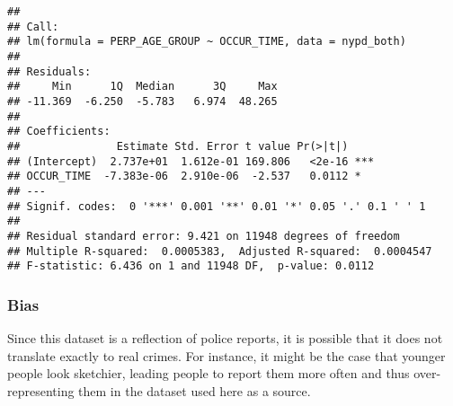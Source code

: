 \documentclass[
]{article}
\begin{document}
\begin{verbatim}
## 
## Call:
## lm(formula = PERP_AGE_GROUP ~ OCCUR_TIME, data = nypd_both)
## 
## Residuals:
##     Min      1Q  Median      3Q     Max 
## -11.369  -6.250  -5.783   6.974  48.265 
## 
## Coefficients:
##               Estimate Std. Error t value Pr(>|t|)    
## (Intercept)  2.737e+01  1.612e-01 169.806   <2e-16 ***
## OCCUR_TIME  -7.383e-06  2.910e-06  -2.537   0.0112 *  
## ---
## Signif. codes:  0 '***' 0.001 '**' 0.01 '*' 0.05 '.' 0.1 ' ' 1
## 
## Residual standard error: 9.421 on 11948 degrees of freedom
## Multiple R-squared:  0.0005383,  Adjusted R-squared:  0.0004547 
## F-statistic: 6.436 on 1 and 11948 DF,  p-value: 0.0112
\end{verbatim}

\hypertarget{bias}{%
\subsubsection{Bias}\label{bias}}

Since this dataset is a reflection of police reports, it is possible
that it does not translate exactly to real crimes. For instance, it
might be the case that younger people look sketchier, leading people to
report them more often and thus over-representing them in the dataset
used here as a source.
\end{document}
